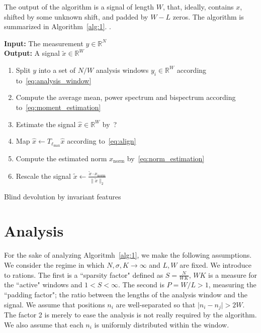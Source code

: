 \documentclass[journal]{IEEEtran}
\newcommand{\TODO}[1]{{\color{red}{[#1]}}}
\numberwithin{equation}{section}
\numberwithin{figure}{section}
\theoremstyle{plain}
\theoremstyle{definition}
\theoremstyle{remark}
\theoremstyle{plain}
\theoremstyle{remark}
\theoremstyle{plain}
\theoremstyle{plain}
\newcommand{\RN}{\mathbb{R}^N}
\begin{document}
The output of the algorithm is a signal of length $W$, that, ideally, contains $x$, shifted by some unknown shift, and padded by $W-L$ zeros. 
The algorithm is summarized in Algorithm~\ref{alg:1}.
\TODO{We should come up with a method to automatic aligning of the signal}.


\begin{algorithm}[h]
		\textbf{Input:} The measurement $y\in\RN$ \\ 
		\textbf{Output:} A signal $\tilde x\in\mathbb{R}^W$  \\ 
		\begin{enumerate}
			\item Split $y$ into a set of $N/W$ analysis windows $y_i\in\mathbb{R}^W$ according to~\eqref{eq:analysis_window}
			\item  Compute the average mean, power spectrum and bispectrum according to~\eqref{eq:moment_estimation} 
			\item  Estimate the signal $\hat{x}\in\mathbb{R}^W$ by~?
			\item  Map $\hat{x}\gets T_{\ell_{\max}}\hat{x}$ according to~\eqref{eq:align}
			\item  Compute the estimated norm $x_{\textrm{norm}}$  by~\eqref{eq:norm_estimation}
			\item  Rescale the signal $\tilde x \gets \frac{\tilde{x}\cdot x_{\textrm{norm}}}{\|\tilde{x}\|_2} $   
		\end{enumerate}
	\caption{Blind devolution by invariant features} 	\label{alg:1}
\end{algorithm}


\section{Analysis} \label{sec:analysis}

For the sake of analyzing Algoritmh~\ref{alg:1}, we make the following assumptions. We consider the regime in which $N,\sigma,K\to\infty$ and  $L,W$ are fixed. We introduce to rations. The first is a ``sparsity factor" defined as $S = \frac{N}{WK}$, $WK$ is a measure for the ``active" windows and $1<S<\infty$. The second is $P = W/L>1$, measuring the ``padding factor"; the ratio between the lengths of the analysis window and the signal. We assume that positions $n_i$ are well-separated so that $\vert n_i - n_j\vert >2W$. The factor 2 is merely to ease the analysis is not really required by the algorithm. We also assume that each $n_i$ is uniformly distributed within the window. 
\end{document}
